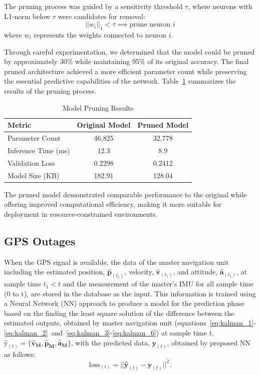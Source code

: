 \documentclass[3p]{elsarticle}
\begin{document}
The pruning process was guided by a sensitivity threshold \(\tau\), where neurons with L1-norm below \(\tau\) were candidates for removal:
\begin{equation}
    ||w_i||_1 < \tau \implies \text{prune neuron } i
\end{equation}
where \(w_i\) represents the weights connected to neuron \(i\).

Through careful experimentation, we determined that the model could be pruned by approximately 30\% while maintaining 95\% of its original accuracy. The final pruned architecture achieved a more efficient parameter count while preserving the essential predictive capabilities of the network. Table~\ref{tab:pruning_results} summarizes the results of the pruning process.

\begin{table}[H]
    \centering
    \caption{Model Pruning Results}
    \label{tab:pruning_results}
    \begin{tabular}{l c c}
        \hline
        \textbf{Metric} & \textbf{Original Model} & \textbf{Pruned Model} \\
        \hline
        Parameter Count & 46,825 & 32,778 \\
        Inference Time (ms) & 12.3 & 8.9 \\
        Validation Loss & 0.2298 & 0.2412 \\
        Model Size (KB) & 182.91 & 128.04 \\
        \hline
    \end{tabular}
\end{table}

The pruned model demonstrated comparable performance to the original while offering improved computational efficiency, making it more suitable for deployment in resource-constrained environments.



\subsection{GPS Outages}
\noindent When the GPS signal is available, the data of the master navigation unit including the estimated position, \(\hat{\mathbf{p}}_{(t_1)}\), velocity, \(\hat{\mathbf{v}}_{(t_1)}\), and attitude, \(\hat{\mathbf{a}}_{(t_1)}\), at sample time \(t_1 < t\) and the measurement of the master's IMU for all sample time (0 to t), are stored in the database as the input.
This information is trained using a Neural Network (NN) approach to produce a model for the prediction phase based on the finding the least square solution of the difference between the estimated outputs, obtained by master navigation unit (equations~\eqref{eq:kalman_1}-\eqref{eq:kalman_2}~and~\eqref{eq:kalman_3}-\eqref{eq:kalman_6}) at sample time \(t\), \(\hat{\mathbf{\mathrm{y}}}_{(t)} = \{ \hat{\mathbf{v}}_{\mathbf{M}}, \hat{\mathbf{p}}_{\mathbf{M}}, \hat{\mathbf{a}}_{\mathbf{M}} \}\), with the predicted data, \(\mathbf{{y}}_{(t)}\), obtained by proposed NN as follows:
\begin{equation}
	\mathrm{loss}_{(t)} = || \hat{\mathbf{{y}}}_{(t)} - \mathbf{{y}}_{(t)} ||^2.
\end{equation}
\end{document}
